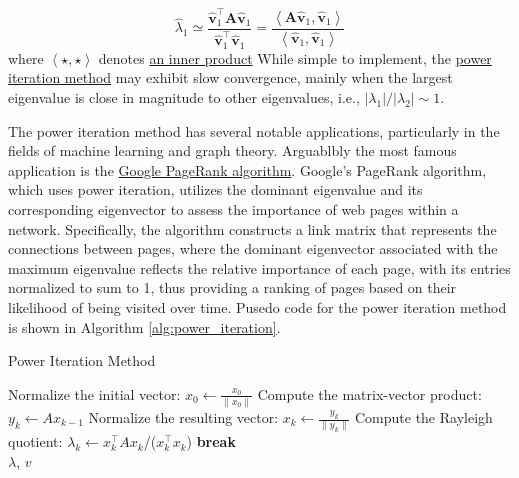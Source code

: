 \documentclass{article}[11pt]
\begin{document}
\begin{mdframed}
\begin{itemize}[leftmargin=16pt]
{   \begin{equation}
      \hat{\lambda}_{1} \simeq \frac{\hat{\mathbf{v}}_{1}^{\top}\mathbf{A}\hat{\mathbf{v}}_{1}}{\hat{\mathbf{v}}_{1}^{\top}\hat{\mathbf{v}}_{1}} = \frac{\left<\mathbf{A}\hat{\mathbf{v}}_{1},\hat{\mathbf{v}}_{1}\right>}{\left<\hat{\mathbf{v}}_{1},\hat{\mathbf{v}}_{1}\right>}
   \end{equation}
where $\left<\star,\star\right>$ denotes \href{https://mathworld.wolfram.com/InnerProduct.html}{an inner product}}
While simple to implement, the \href{https://en.wikipedia.org/wiki/Power_iteration}{power iteration method} may exhibit slow convergence, mainly when the largest eigenvalue is close in magnitude to other eigenvalues, i.e., $|\lambda_{1}|/|\lambda_{2}| \sim 1$.
\end{itemize}
\end{mdframed}
The power iteration method has several notable applications, particularly in the fields of machine learning and graph theory.
Arguablbly the most famous application is the \href{https://en.wikipedia.org/wiki/PageRank}{Google PageRank algorithm}.
Google's PageRank algorithm, which uses power iteration, utilizes the dominant eigenvalue and its corresponding eigenvector to assess the importance of web pages within a network.
Specifically, the algorithm constructs a link matrix that represents the connections between pages, where the dominant eigenvector associated with the maximum eigenvalue 
reflects the relative importance of each page, with its entries normalized to sum to 1, thus providing a ranking of pages based on their likelihood of being visited over time.
Pusedo code for the power iteration method is shown in Algorithm \ref{alg:power_iteration}.

\begin{algorithm}[H]
   \caption{Power Iteration Method}\label{alg:power_iteration}
\begin{algorithmic}[1]
   
   \State Normalize the initial vector: $x_0 \leftarrow \frac{x_0}{\|x_0\|}$
       \State Compute the matrix-vector product: $y_k \leftarrow A x_{k-1}$
       \State Normalize the resulting vector: $x_k \leftarrow \frac{y_k}{\|y_k\|}$
       \State Compute the Rayleigh quotient: $\lambda_k \leftarrow x_k^\top A x_k$/($x_k^\top x_k$)
           \State \textbf{break}
       \EndIf
   \EndFor
   \\
   \Return $\lambda$, $v$
   \end{algorithmic}
\end{algorithm}
\end{document}
